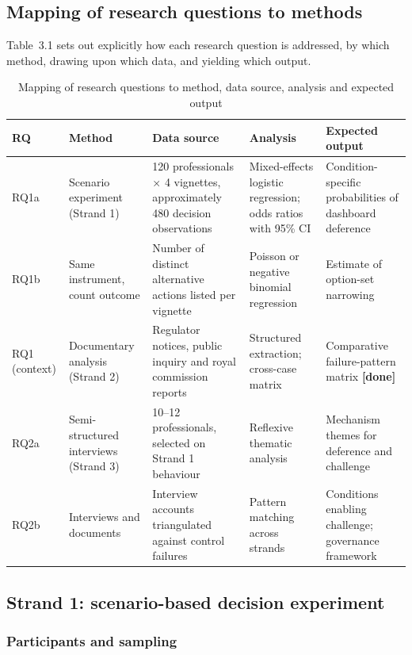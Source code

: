 \documentclass[11pt,a4paper]{article}
\numberwithin{figure}{section}
\numberwithin{table}{section}
\newcommand{\xref}[1]{\textcolor{citeblue}{#1}}         %
\begin{document}
\subsection{Mapping of research questions to methods}

\xref{Table~3.1} sets out explicitly how each research question is addressed, by which method,
drawing upon which data, and yielding which output.

\begin{table}[H]
\centering\footnotesize
\caption{Mapping of research questions to method, data source, analysis and expected output}
\label{tab:matrix}
\begin{tabularx}{\textwidth}{@{}p{1.0cm} p{2.3cm} X p{2.6cm} p{2.7cm}@{}}
\toprule
\textbf{RQ} & \textbf{Method} & \textbf{Data source} & \textbf{Analysis} & \textbf{Expected output} \\
\midrule
RQ1a & Scenario experiment (Strand 1) & 120 professionals $\times$ 4 vignettes, approximately 480
decision observations & Mixed-effects logistic regression; odds ratios with 95\% CI &
Condition-specific probabilities of dashboard deference \\
RQ1b & Same instrument, count outcome & Number of distinct alternative actions listed per vignette &
Poisson or negative binomial regression & Estimate of option-set narrowing \\
RQ1 (context) & Documentary analysis (Strand 2) & Regulator notices, public inquiry and royal
commission reports & Structured extraction; cross-case matrix & Comparative failure-pattern matrix
\textcolor{nublue}{\textbf{[done]}} \\
RQ2a & Semi-structured interviews (Strand 3) & 10--12 professionals, selected on Strand 1 behaviour
& Reflexive thematic analysis & Mechanism themes for deference and challenge \\
RQ2b & Interviews and documents & Interview accounts triangulated against control failures &
Pattern matching across strands & Conditions enabling challenge; governance framework \\
\bottomrule
\end{tabularx}
\end{table}

\subsection{Strand 1: scenario-based decision experiment}

\subsubsection{Participants and sampling}
\end{document}
